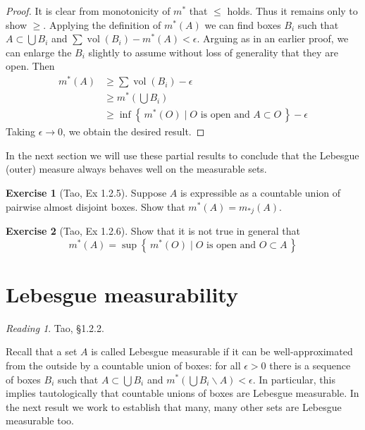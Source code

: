 \documentclass[10pt,oneside]{amsbook}
\newcommand{\set}[1]{\left\{\,#1\,\right\}}
\renewcommand{\setminus}{\smallsetminus}
\DeclareMathOperator{\vol}{vol}
\theoremstyle{definition}
\newtheorem{exerc}{Exercise}[section]
\theoremstyle{plain}
\theoremstyle{definition}
\theoremstyle{remark}
\newtheorem*{reading}{Reading}
\numberwithin{equation}{section}
\numberwithin{figure}{section}
\begin{document}
\begin{proof}
  It is clear from monotonicity of $m^*$ that $\leq$ holds. Thus it remains only to show $\geq$. Applying the definition of $m^*(A)$ we can find boxes $B_i$ such that $A\subset\bigcup B_i$ and $\sum\vol(B_i)-m^*(A)<\epsilon$. Arguing as in an earlier proof, we can enlarge the $B_i$ slightly to assume without loss of generality that they are open. Then
  \begin{align*}
    m^*(A)&\geq\sum\vol(B_i)-\epsilon\\
          &\geq m^*(\bigcup B_i)\\
          &\geq \inf\set{m^*(O)\mid\text{$O$ is open and }A\subset O}-\epsilon
  \end{align*}
  Taking $\epsilon\to0$, we obtain the desired result.
\end{proof}

In the next section we will use these partial results to conclude that the Lebesgue (outer) measure always behaves well on the measurable sets.

\begin{exerc}[Tao, Ex 1.2.5]
  Suppose $A$ is expressible as a countable union of pairwise almost disjoint boxes. Show that $m^*(A)=m_{*j}(A)$.
\end{exerc}

\begin{exerc}[Tao, Ex 1.2.6]
  Show that it is not true in general that
  \[m^*(A)=\sup\set{m^*(O)\mid\text{$O$ is open and }O\subset A}
  \]
\end{exerc}


\newpage
\section{Lebesgue measurability}

\begin{reading}
  Tao, \S 1.2.2.
\end{reading}

Recall that a set $A$ is called Lebesgue measurable if it can be well-approximated from the outside by a countable union of boxes: for all $\epsilon>0$ there is a sequence of boxes $B_i$ such that $A\subset\bigcup B_i$ and $m^*(\bigcup B_i\setminus A)<\epsilon$. In particular, this implies tautologically that countable unions of boxes are Lebesgue measurable. In the next result we work to establish that many, many other sets are Lebesgue measurable too.
\end{document}
